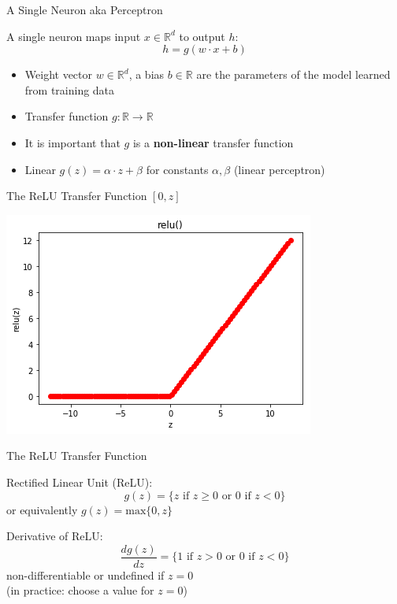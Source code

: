\begin{frame}{A Single Neuron \pause aka Perceptron}
\begin{block}{A single neuron maps input $x \in \mathbb{R}^d$ to output $h$:}
\[ h = g(w \cdot x + b) \]
\end{block}
\begin{itemize}[<+->]
\item Weight vector $w \in \mathbb{R}^d$, a bias $b \in \mathbb{R}$ are the parameters of the model learned from training data
\item Transfer function $g : \mathbb{R} \rightarrow \mathbb{R}$
\item It is important that $g$ is a \textbf{non-linear} transfer function
\item Linear $g(z) = \alpha \cdot z + \beta$ for constants $\alpha, \beta$ \pause (linear perceptron)
\end{itemize}
\end{frame}

\begin{frame}{The ReLU Transfer Function $[0,z]$}
\begin{block}{}
\centering
\includegraphics[scale=0.6]{figures/relu.png}
\end{block}
\end{frame}

\begin{frame}{The ReLU Transfer Function}
\begin{block}{Rectified Linear Unit (ReLU):}
\[ g(z) = \{ z \textrm{ if } z \geq 0 \textrm{ or } 0 \textrm{ if } z < 0 \} \]
or equivalently $g(z) = \textrm{max}\{0,z\}$
\end{block}

\pause
\begin{block}{Derivative of ReLU:}
\[ \frac{d g(z)}{dz} = \{ 1 \textrm{ if } z > 0 \textrm{ or } 0 \textrm{ if } z < 0 \} \]
non-differentiable or undefined if $z = 0$ \\
(in practice: choose a value for $z = 0$)
\end{block}
\end{frame}

